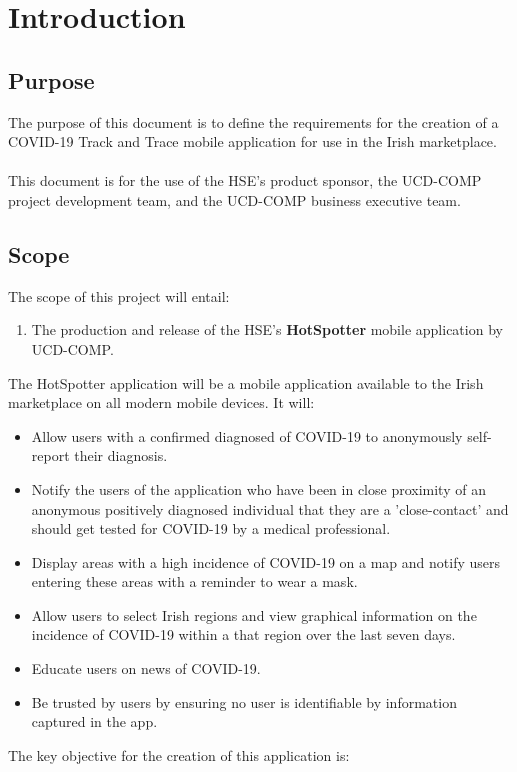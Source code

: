 \documentclass{scrreprt}
\begin{document}
\chapter{Introduction}\label{Intro}

\section{Purpose}\label{Purpose}
The purpose of this document is to define the requirements for the creation of a COVID-19 Track and Trace mobile application for use in the Irish marketplace. \\
\\
This document is for the use of the HSE's product sponsor, the UCD-COMP project development team, and the UCD-COMP business executive team.

\section{Scope}\label{Scope}
The scope of this project will entail:
\begin{enumerate}
	\item The production and release of the HSE's \textbf{HotSpotter} mobile application by UCD-COMP. 
\end{enumerate}
The HotSpotter application will be a mobile application available to the Irish marketplace on all modern mobile devices. It will:
\begin{itemize}
	\item Allow users with a confirmed diagnosed of COVID-19 to anonymously self-report their diagnosis.
	\item Notify the users of the application who have been in close proximity of an anonymous positively diagnosed individual that they are a 'close-contact' and should get tested for COVID-19 by a medical professional.
	\item Display areas with a high incidence of COVID-19 on a map and notify users entering these areas with a reminder to wear a mask.
	\item Allow users to select Irish regions and view graphical information on the incidence of COVID-19 within a that region over the last seven days.
	\item Educate users on news of COVID-19.
	\item Be trusted by users by ensuring no user is identifiable by information captured in the app.
\end{itemize}
The key objective for the creation of this application is:
\end{document}
